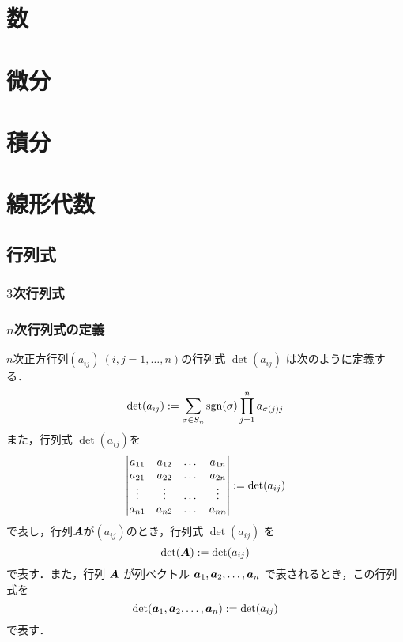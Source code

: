 \documentclass[autodetect-engine,dvipdfmx-if-dvi,ja=standard,a4paper,12pt]{bxjsbook}
\begin{document}
	\tableofcontents
	\part{数}
	\part{微分}
	\part{積分}
	\part{線形代数}
		\chapter{行列式}
			\section{$3$次行列式}
			\section{$n$次行列式の定義}
				\begin{dfn} $n$次正方行列$(a_{i j}) \ (i,j = 1 ,\dots,n)$の行列式 $\det(a_{ij})$ は次のように定義する．
					\begin{equation}
						\det(a_{i j}) := \sum_{\sigma \in S_n} \operatorname{\mathrm{sgn}}(\sigma) \prod_{j=1}^{n} a_{\sigma(j) j}
					\end{equation}
					また，行列式 $\det(a_{i j})$を
					\begin{equation}
						\begin{vmatrix}
							a_{1 1} & a_{1 2} & \dots & a_{1 n} \\
							a_{2 1} & a_{2 2} & \dots & a_{2 n} \\
							\vdots & \vdots & \dots & \vdots \\
							a_{n 1} & a_{n 2} & \dots & a_{n n}
						\end{vmatrix}
						:= \det(a_{i j})
					\end{equation}
					で表し，行列$\boldsymbol{A}$が$(a_{i j})$のとき，行列式 $\det(a_{i j})$ を
					\begin{equation}
						\det(\boldsymbol{A}) := \det(a_{i j})
					\end{equation}
					で表す．また，行列 $\boldsymbol{A}$ が列ベクトル $\boldsymbol{a}_1, \boldsymbol{a}_2, \dots, \boldsymbol{a}_n$ で表されるとき，この行列式を
					\begin{equation}
						\det(\boldsymbol{a}_1,\boldsymbol{a}_2, \dots, \boldsymbol{a}_n) := \det(a_{i j})
					\end{equation}
					で表す．
				\end{dfn}
\end{document}
